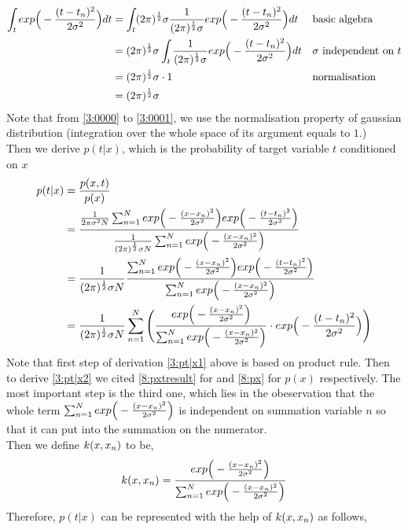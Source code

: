 \documentclass[11pt,a4paper]{article}
\newcommand{\htab}{\hspace*{0.63cm}}
\begin{document}
{    \begin{align}
        \int_{t} exp \Big( - \frac{(t-t_{n})^{2}}{2\sigma^{2}} \Big) dt &= \int_{t} (2\pi)^{\frac{1}{2}} \sigma \frac{1}{ (2\pi)^{\frac{1}{2}} \sigma} exp \Big( - \frac{(t-t_{n})^{2}}{2\sigma^{2}} \Big) dt   
        &&\mbox {basic algebra} \\
        &= (2\pi)^{\frac{1}{2}} \sigma \int_{t} \frac{1}{ (2\pi)^{\frac{1}{2}} \sigma} exp \Big( - \frac{(t-t_{n})^{2}}{2\sigma^{2}} \Big) dt  \label{3:0000}
        &&\mbox{$\sigma$ independent on $t$} \\ 
        &= (2\pi)^{\frac{1}{2}} \sigma \cdot 1   \label{3:0001} 
        &&\mbox{normalisation} \\
        &= (2\pi)^{\frac{1}{2}} \sigma   \label{8:normalization}
    \end{align}
\htab Note that from \eqref{3:0000} to \eqref{3:0001}, we use the normalisation property of gaussian distribution (integration over the whole space of its argument equals to $1$.) \\
\htab Then we derive $p(t|x)$, which is the probability of target variable $t$ conditioned on $x$
    \begin{align}
        p(t|x) &= \frac{p(x,t)}{p(x)} \label{3:pt|x1} \\
               &= \frac{\frac{1}{2\pi \sigma^{2} N} \sum_{n=1}^{N}  
        exp \Big( - \frac{(x-x_{n})^{2}} {2\sigma^{2}} \Big)
        exp \Big( -  \frac{(t-t_{n})^{2}}{2\sigma^{2}} \Big) } 
        { \frac{1}{(2\pi)^{\frac{1}{2}} \sigma N} \sum_{n=1}^{N}  
        exp \Big( - \frac{(x-x_{n})^{2}} {2\sigma^{2}} \Big) } \label{3:pt|x2} \\
        &= \frac{1}{(2\pi)^{\frac{1}{2}} \sigma N} \frac{ \sum_{n=1}^{N}  
        exp \Big( - \frac{(x-x_{n})^{2}} {2\sigma^{2}} \Big)
        exp \Big( -  \frac{(t-t_{n})^{2}}{2\sigma^{2}} \Big) } 
        {  \sum_{n=1}^{N} exp \Big( - \frac{(x-x_{n})^{2}} {2\sigma^{2}} \Big) } \label{3:pt|x3}\\ 
        &= \frac{1}{(2\pi)^{\frac{1}{2}} \sigma N}  \sum_{n=1}^{N}  \Bigg(
        \frac {exp \Big( - \frac{(x-x_{n})^{2}}{2\sigma^{2}} \Big)}{\sum_{n=1}^{N} exp \Big( - \frac{(x-x_{n})^{2}}{2\sigma^{2}} \Big) } \cdot exp \Big( - \frac{(t-t_{n})^{2}}{2\sigma^{2}} \Big) \Bigg)
        \label{8:p|xfull}
        \end{align}
\htab Note that first step of derivation \eqref{3:pt|x1} above is based on product rule. 
Then to derive \eqref{3:pt|x2} we cited \eqref{8:pxtresult} for and \eqref{8:px} for $p(x)$ respectively.
The most important step is the third one, which lies in the obeservation that the whole term 
$\sum_{n=1}^{N} exp \Big( - \frac{(x-x_{n})^{2}}{2\sigma^{2}} \Big)$ is independent on summation variable $n$ so that it can put into the summation on
the numerator.\\
\htab Then we define $k(x,x_{n})$ to be,
\begin{align}
    k(x,x_{n}) = \frac {exp \Big( - \frac{(x-x_{n})^{2}}{2\sigma^{2}} \Big)}{\sum_{n=1}^{N} exp \Big( - \frac{(x-x_{n})^{2}}{2\sigma^{2}} \Big) } \label{3:kernel}
    \end{align}
\htab Therefore, $p(t|x)$ can be represented with the help of $k(x,x_{n})$ as follows,
}
\end{document}
